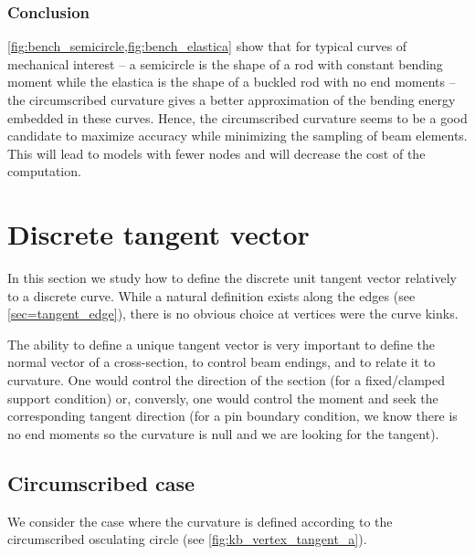 \subsubsection{Conclusion}
\cref{fig:bench_semicircle,fig:bench_elastica} show that for typical curves of mechanical interest -- a semicircle is the shape of a rod with constant bending moment while the elastica is the shape of a buckled rod with no end moments -- the circumscribed curvature gives a better approximation of the bending energy embedded in these curves. Hence, the circumscribed curvature seems to be a good candidate to maximize accuracy while minimizing the sampling of beam elements. This will lead to models with fewer nodes and will decrease the cost of the computation.

\section{Discrete tangent vector}\label{sec=discrete_tangent}

In this section we study how to define the discrete unit tangent vector relatively to a discrete curve. While a natural definition exists along the edges (see \cref{sec=tangent_edge}), there is no obvious choice at vertices were the curve kinks.

The ability to define a unique tangent vector is very important to define the normal vector of a cross-section, to control beam endings, and to relate it to curvature. One would control the direction of the section (for a fixed/clamped support condition) or, conversly, one would control the moment and seek the corresponding tangent direction (for a pin boundary condition, we know there is no end moments so the curvature is null and we are looking for the tangent).

\subsection{Circumscribed case}\label{sec=discrete_tangent_circumscribed}

We consider the case where the curvature is defined according to the circumscribed osculating circle (see \cref{fig:kb_vertex_tangent_a}).


